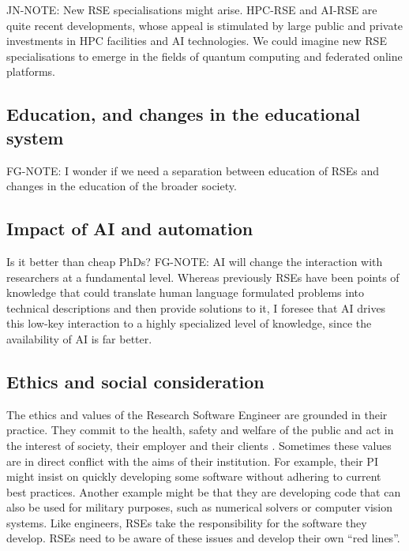 \documentclass{eceasst}
\begin{document}
\begin{FramedParagraphWithFootnotes}
JN-NOTE:
New RSE specialisations might arise.
HPC-RSE and AI-RSE are quite recent developments,
whose appeal is stimulated by large public and private
investments in HPC facilities and AI technologies.
We could imagine new RSE specialisations to emerge in the fields
of quantum computing and federated online platforms.
\end{FramedParagraphWithFootnotes}


\subsection{Education, and changes in the educational system}
FG-NOTE: I wonder if we need a separation between education of RSEs and changes in the education of the broader society.

\subsection{Impact of AI and automation}
Is it better than cheap PhDs?
FG-NOTE: AI will change the interaction with researchers at a fundamental level. Whereas previously RSEs have been points of knowledge that could translate human language formulated problems into technical descriptions and then provide solutions to it,
I foresee that AI drives this low-key interaction to a highly specialized level of knowledge, since the availability of AI is far better.

\subsection{Ethics and social consideration}
The ethics and values of the Research Software Engineer are grounded in their practice.
They commit to the health, safety and welfare of the public and act in the interest of society, their employer and their clients \cite{Goth2023}.
Sometimes these values are in direct conflict with the aims of their institution.
For example, their PI might insist on quickly developing some software without adhering to current best practices.
Another example might be that they are developing code that can also be used for military purposes, such as numerical solvers or computer vision systems.
Like engineers, RSEs take the responsibility for the software they develop.
RSEs need to be aware of these issues and develop their own ``red lines''.
\end{document}

